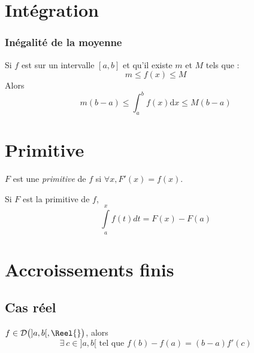 \documentclass[11pt,a4paper,fleqn,pdftex]{report}
\begin{document}
\section{Intégration}
\subsubsection{Inégalité de la moyenne} %
\label{ssub:inegalite_de_la_moyenne}
\begin{itheorem}
    Si $f$ est  sur un intervalle $[a,b]$ et qu'il existe $m$ et $M$ tels que : 
    \[
        m \le f(x) \le M
    \]
    Alors 
    \begin{equation}\label{eq:inegalite_de_la_moyenne}
    m(b-a) \le \int_a^b f(x) \mathrm{d}x \le M(b-a)
    \end{equation}
\end{itheorem}
    
\section{Primitive}
\begin{dfn}[Primitive]
$F$ est une \emph{primitive} de $f$ si $\forall x, F'(x)=f(x)$. 
\end{dfn}
\begin{theorem}
Si $F$ est la primitive de $f$,
\begin{equation}
    \int \limits_a^x f(t) dt = F(x) - F(a)
\end{equation}
\end{theorem}

\section{Accroissements finis}
\subsection{Cas réel} %
\begin{theorem}
\label{thm:accroissements_finis}
\begin{minipage}{0.6\textwidth}
$f \in \mathcal{D}\big( ]a,b[,\Reel{} \big)$, alors 
\begin{equation}
\exists \: c \in ]a,b[ \text{ tel que }\boxed{f(b) - f(a) = (b-a) f'(c)}
\end{equation}
\end{minipage}\hspace{1cm}
\begin{minipage}{0.3\textwidth}
\end{minipage}
\end{theorem}
\end{document}
